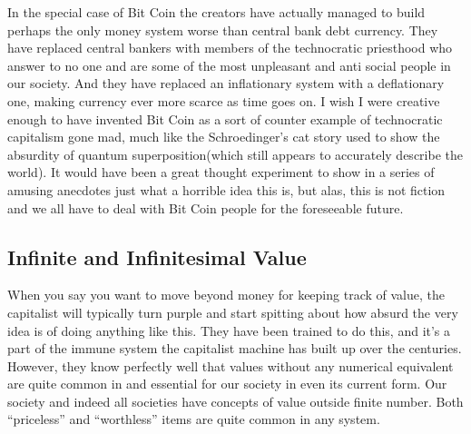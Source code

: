 In the special case of Bit Coin the creators have actually managed to
build perhaps the only money system worse than central bank debt
currency. They have replaced central bankers with members of the
technocratic priesthood who answer to no one and are some of the most
unpleasant and anti social people in our society. And they have replaced
an inflationary system with a deflationary one, making currency ever
more scarce as time goes on. I wish I were creative enough to have
invented Bit Coin as a sort of counter example of technocratic
capitalism gone mad, much like the Schroedinger's cat story used to show
the absurdity of quantum superposition(which still appears to accurately
describe the world). It would have been a great thought experiment to
show in a series of amusing anecdotes just what a horrible idea this is,
but alas, this is not fiction and we all have to deal with Bit Coin
people for the foreseeable future.

\subsection{Infinite and Infinitesimal
Value}\label{infinite-and-infinitesimal-value}

When you say you want to move beyond money for keeping track of value,
the capitalist will typically turn purple and start spitting about how
absurd the very idea is of doing anything like this. They have been
trained to do this, and it's a part of the immune system the capitalist
machine has built up over the centuries. However, they know perfectly
well that values without any numerical equivalent are quite common in
and essential for our society in even its current form. Our society and
indeed all societies have concepts of value outside finite number. Both
``priceless'' and ``worthless'' items are quite common in any system.

